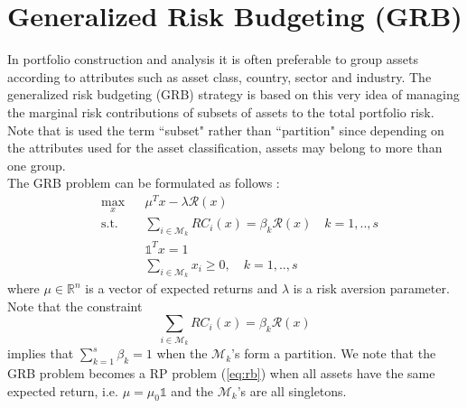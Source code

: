 \section{Generalized Risk Budgeting (GRB)}
In portfolio construction and analysis it is often preferable to group assets according to attributes such as asset class, country, sector and industry. The generalized risk budgeting (GRB) strategy is based on this very idea of managing the marginal risk contributions of subsets of assets to the total portfolio risk. Note that is used the term \textquotedblleft subset" rather than \textquotedblleft partition" since depending on the attributes used for the asset classification, assets may belong to more than one group.\\
The GRB problem can be formulated as follows \cite{sdp}:
\begin{equation}\label{eq:grb}
\begin{aligned}
& \underset{x}{\text{max}}
&& \mu^Tx - \lambda\mathcal{R}(x)\\
& \text{s.t.}
&&\sum_{i \in \mathcal{M}_k} RC_i(x) = \beta_k \mathcal{R}(x) \quad k=1,..,s\\
&&&\mathds{1}^T x = 1\\
&&&\sum_{i \in \mathcal{M}_k} x_i \geq 0, \quad k=1,..,s
\end{aligned}
\end{equation}
where $\mu \in \mathbb{R}^n$ is a vector of expected returns and $\lambda$ is a risk aversion parameter. Note that the constraint
\begin{equation}
\sum_{i \in \mathcal{M}_k} RC_i(x) = \beta_k \mathcal{R}(x)
\end{equation}
implies that $\sum_{k=1}^s \beta_k =1$ when the $\mathcal{M}_k$'s form a partition. We note that the GRB problem becomes a RP problem (\ref{eq:rb}) when all assets have the same expected return, i.e. $\mu = \mu_0 \mathds{1}$ and the $\mathcal{M}_k$'s are all singletons.